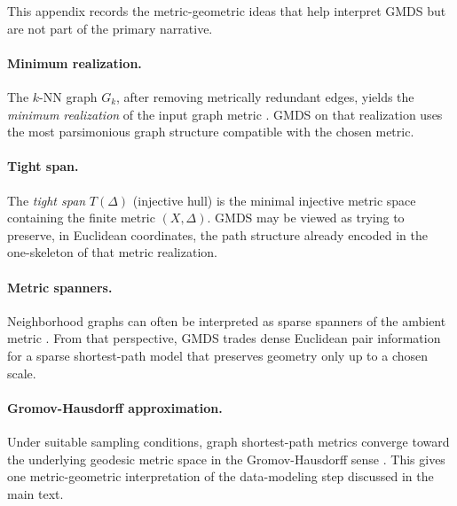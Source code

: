 \documentclass[twoside,11pt]{article}
\newcommand{\Gk}{G_k}
\begin{document}
This appendix records the metric-geometric ideas that help interpret GMDS but
are not part of the primary narrative.

\paragraph{Minimum realization.}
The $k$-NN graph $\Gk$, after removing metrically redundant edges, yields the
\emph{minimum realization} of the input graph metric
\citep{dress1984trees, imrich1984optimal}.  GMDS on that realization uses the
most parsimonious graph structure compatible with the chosen metric.

\paragraph{Tight span.}
The \emph{tight span} $T(\Delta)$ (injective hull) \citep{dress1984trees,
isbell1964six} is the minimal injective metric space containing the finite
metric $(X,\Delta)$.  GMDS may be viewed as trying to preserve, in Euclidean
coordinates, the path structure already encoded in the one-skeleton of that
metric realization.

\paragraph{Metric spanners.}
Neighborhood graphs can often be interpreted as sparse spanners of the ambient
metric \citep{althofer1993sparse, har-peled2006low}.  From that perspective,
GMDS trades dense Euclidean pair information for a sparse shortest-path model
that preserves geometry only up to a chosen scale.

\paragraph{Gromov-Hausdorff approximation.}
Under suitable sampling conditions, graph shortest-path metrics converge toward
the underlying geodesic metric space in the Gromov-Hausdorff sense
\citep{gromov1999metric, latschev2001riemannian, bernstein2000graph}.  This
gives one metric-geometric interpretation of the data-modeling step discussed in
the main text.




\end{document}
